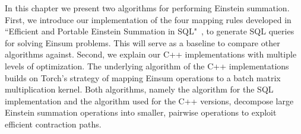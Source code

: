In this chapter we present two algorithms for performing Einstein summation. First,
we introduce our implementation of the four mapping rules developed in ``Efficient and Portable
Einstein Summation in SQL"~\cite{sql_einsum}, to generate SQL queries for solving Einsum problems.
This will serve as a baseline to compare other algorithms against. Second, we explain our C++
implementations with multiple levels of optimization. The underlying algorithm of the C++ 
implementations builds on Torch's strategy of mapping Einsum operations to a batch matrix 
multiplication kernel. Both algorithms, namely the algorithm for the SQL implementation and 
the algorithm used for the C++ versions, decompose large Einstein summation operations
into smaller, pairwise operations to exploit efficient contraction paths.